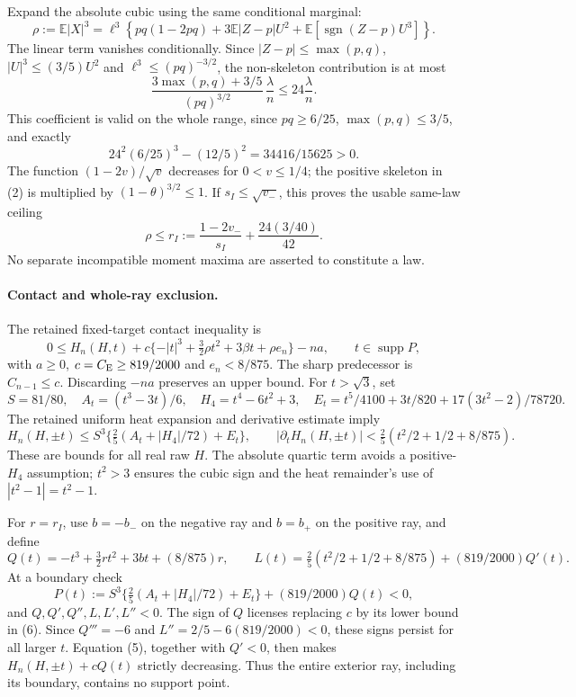\documentclass[10pt]{article}
\newcommand{\E}{\mathbb E}\newcommand{\Pp}{\mathbb P}
\begin{document}
Expand the absolute cubic using the same conditional marginal:
\[
 \rho:=\E|X|^3
 =\ell^3\left\{pq(1-2pq)+3\E|Z-p|U^2
                    +\E[\operatorname{sgn}(Z-p)U^3]\right\}. \tag{2}
\]
The linear term vanishes conditionally.
Since \(|Z-p|\le\max(p,q)\), \(|U|^3\le(3/5)U^2\) and
\(\ell^3\le(pq)^{-3/2}\), the non-skeleton contribution is at most
\[
 \frac{3\max(p,q)+3/5}{(pq)^{3/2}}\,\frac{\lambda}{n}
 \le24\frac{\lambda}{n}.
\]
This coefficient is valid on the whole range, since \(pq\ge6/25\),
\(\max(p,q)\le3/5\), and exactly
\[
 24^2(6/25)^3-(12/5)^2=34416/15625>0.                       \tag{3}
\]
The function \((1-2v)/\sqrt v\) decreases for \(0<v\le1/4\);
the positive skeleton in (2) is multiplied by
\((1-\theta)^{3/2}\le1\).
If \(s_I\le\sqrt{v_-}\), this proves the usable same-law ceiling
\[
 \rho\le r_I:=\frac{1-2v_-}{s_I}+\frac{24(3/40)}{42}.         \tag{4}
\]
No separate incompatible moment maxima are asserted to constitute a law.

\paragraph{Contact and whole-ray exclusion.}
The retained fixed-target contact inequality is
\[
 0\le H_n(H,t)+c\{-|t|^3+\tfrac32\rho t^2+3\beta t+\rho e_n\}
       -na,\qquad t\in\operatorname{supp}P,
\]
with \(a\ge0\), \(c=C_{\rm E}\ge819/2000\) and
\(e_n<8/875\). The sharp predecessor is \(C_{n-1}\le c\).
Discarding \(-na\) preserves an upper bound.
For \(t>\sqrt3\), set
\[
 S=81/80,\quad A_t=(t^3-3t)/6,\quad H_4=t^4-6t^2+3,\quad
 E_t=t^5/4100+3t/820+17(3t^2-2)/78720.
\]
The retained uniform heat expansion and derivative estimate imply
\[
 H_n(H,\pm t)\le S^3\{\tfrac25(A_t+|H_4|/72)+E_t\},\qquad
 |\partial_t H_n(H,\pm t)|<\tfrac25(t^2/2+1/2+8/875).        \tag{5}
\]
These are bounds for all real raw \(H\). The absolute quartic term
avoids a positive-\(H_4\) assumption; \(t^2>3\) ensures the cubic sign
and the heat remainder's use of \(|t^2-1|=t^2-1\).

For \(r=r_I\), use \(b=-b_-\) on the negative ray and \(b=b_+\)
on the positive ray, and define
\[
 Q(t)=-t^3+\tfrac32rt^2+3bt+(8/875)r,\qquad
 L(t)=\tfrac25(t^2/2+1/2+8/875)+(819/2000)Q'(t).
\]
At a boundary check
\[
 P(t):=S^3\{\tfrac25(A_t+|H_4|/72)+E_t\}
                       +(819/2000)Q(t)<0,                 \tag{6}
\]
and \(Q,Q',Q'',L,L',L''<0\).
The sign of \(Q\) licenses replacing \(c\) by its lower bound in
(6). Since \(Q'''=-6\) and
\(L''=2/5-6(819/2000)<0\), these signs persist for all larger \(t\).
Equation (5), together with \(Q'<0\), then makes
\(H_n(H,\pm t)+cQ(t)\) strictly decreasing. Thus the entire exterior
ray, including its boundary, contains no support point.
\end{document}
